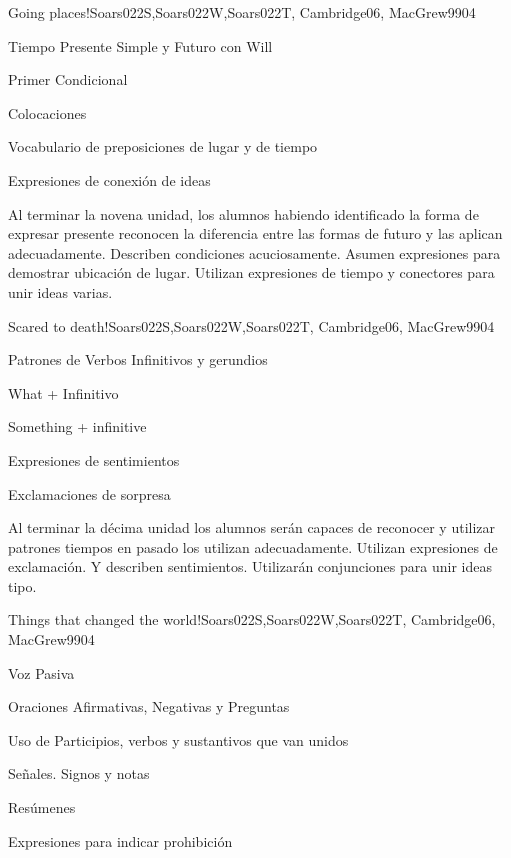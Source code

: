 \begin{syllabus}
\begin{unit}{Going places!}{Soars022S,Soars022W,Soars022T, Cambridge06, MacGrew99}{0}{4}
   \begin{topics}
      \item Tiempo Presente Simple y Futuro con Will
      \item Primer Condicional
      \item Colocaciones
      \item Vocabulario de preposiciones de lugar y de tiempo
      \item Expresiones de conexión de ideas
   \end{topics}

   \begin{unitgoals}
      \item Al terminar la novena unidad, los alumnos habiendo identificado la forma de expresar presente reconocen la diferencia entre las formas de futuro y las aplican adecuadamente. Describen condiciones acuciosamente.  Asumen expresiones para demostrar ubicación de lugar. Utilizan expresiones de tiempo y conectores para unir ideas varias.
   \end{unitgoals}
\end{unit}

\begin{unit}{Scared to death!}{Soars022S,Soars022W,Soars022T, Cambridge06, MacGrew99}{0}{4}
   \begin{topics}
      \item Patrones de Verbos Infinitivos y gerundios
      \item What + Infinitivo
      \item Something + infinitive
      \item Expresiones de sentimientos
      \item Exclamaciones de sorpresa 
   \end{topics}

   \begin{unitgoals}
      \item Al terminar la décima unidad los alumnos serán capaces de reconocer y utilizar patrones tiempos en pasado los utilizan adecuadamente. Utilizan expresiones de exclamación. Y describen sentimientos. Utilizarán conjunciones para unir ideas tipo.
   \end{unitgoals}
\end{unit}

\begin{unit}{Things that changed the world!}{Soars022S,Soars022W,Soars022T, Cambridge06, MacGrew99}{0}{4}
   \begin{topics}
      \item Voz Pasiva
      \item Oraciones Afirmativas, Negativas y Preguntas
      \item Uso de Participios, verbos y sustantivos que van unidos
      \item Señales. Signos y notas
      \item Resúmenes
      \item Expresiones para indicar prohibición
   \end{topics}


\end{unit}
\end{syllabus}
